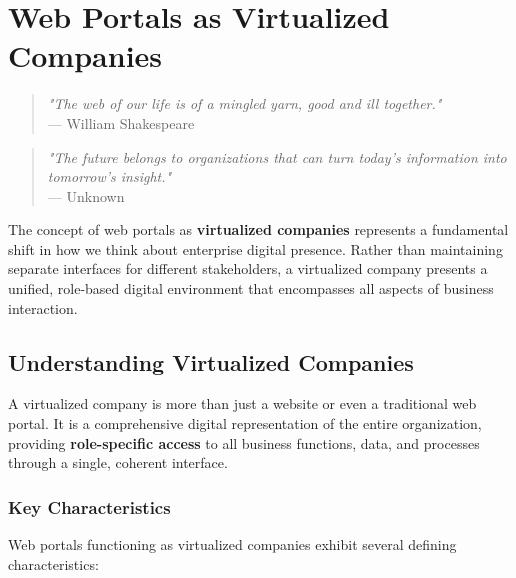 
\chapter{Web Portals as Virtualized Companies}
\label{chap:virtualized-companies}

\begin{quote}
\textit{"The web of our life is of a mingled yarn, good and ill together."} \\
— William Shakespeare
\end{quote}

\begin{quote}
\textit{"The future belongs to organizations that can turn today's information into tomorrow's insight."} \\
— Unknown
\end{quote}

The concept of web portals as \textbf{virtualized companies} represents a fundamental shift in how we think about enterprise digital presence. Rather than maintaining separate interfaces for different stakeholders, a virtualized company presents a unified, role-based digital environment that encompasses all aspects of business interaction.

\section{Understanding Virtualized Companies}
\label{sec:understanding-virtualized}

A virtualized company is more than just a website or even a traditional web portal. It is a comprehensive digital representation of the entire organization, providing \textbf{role-specific access} to all business functions, data, and processes through a single, coherent interface.

\subsection{Key Characteristics}

Web portals functioning as virtualized companies exhibit several defining characteristics:

